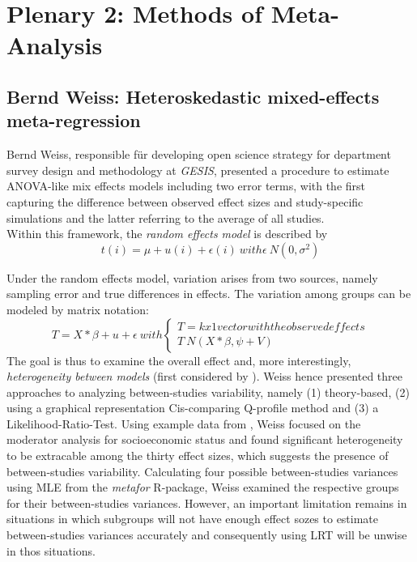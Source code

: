 \documentclass[a4paper,man,natbib]{apa6}
\begin{document}
\section{Plenary 2: Methods of Meta-Analysis}
\label{methodology}
\justifying

\subsection{Bernd Weiss: Heteroskedastic mixed-effects meta-regression}

Bernd Weiss, responsible für developing open science strategy for department survey design and methodology at \textit{GESIS}, presented a procedure to estimate ANOVA-like mix effects models including two error terms, with the first capturing the difference between observed effect sizes and study-specific simulations and the latter referring to the average of all studies. \\
Within this framework, the \textit{random effects model} is described by
\begin{equation}
	t(i) = \mu + u(i) + \epsilon(i)\ with \epsilon ~ N(0,\sigma^2)
\end{equation}

Under the random effects model, variation arises from two sources, namely sampling error and true differences in effects. The variation among groups can be modeled by matrix notation: 
\begin{equation}
T = X * \beta + u + \epsilon \ with \left\{
\begin{array}{ll}
T = kx1 vector with the observed effects\\
T ~ N(X*\beta,\psi+V)
\end{array}
\right.
\end{equation}
The goal is thus to examine the overall effect and, more interestingly, \textit{heterogeneity between models} (first considered by \cite{Hedges1982}). 
Weiss hence presented three approaches to analyzing between-studies variability, namely (1) theory-based, (2) using a graphical representation Cis-comparing Q-profile method and (3) a Likelihood-Ratio-Test. 
Using example data from \cite{Ehri2001}, Weiss focused on the moderator analysis for socioeconomic status and found significant heterogeneity to be extracable among the thirty effect sizes, which suggests the presence of between-studies variability. 
Calculating four possible between-studies variances using MLE from the \textit{metafor} R-package, Weiss examined the respective groups for their between-studies variances. However, an important limitation remains in situations in which subgroups will not have enough effect sozes to estimate between-studies  variances accurately and consequently using LRT will be unwise in thos situations. 
\end{document}

